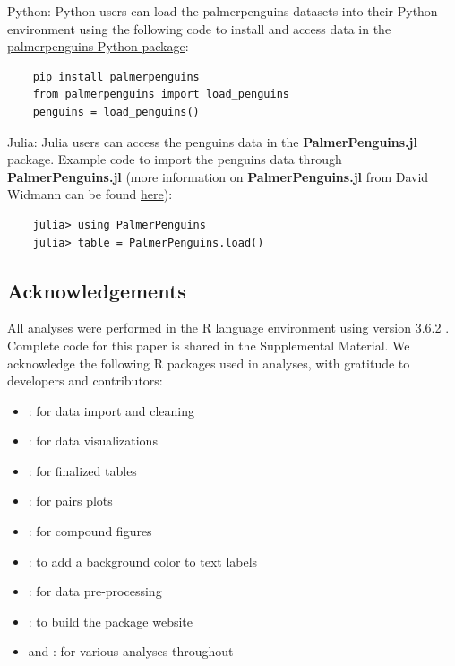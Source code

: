 Python: Python users can load the palmerpenguins datasets into their
Python environment using the following code to install and access data
in the \href{https://pypi.org/project/palmerpenguins/}{palmerpenguins
Python package}:

\begin{verbatim}
    pip install palmerpenguins
    from palmerpenguins import load_penguins
    penguins = load_penguins()
\end{verbatim}

Julia: Julia users can access the penguins data in the
\textbf{PalmerPenguins.jl} package. Example code to import the penguins
data through \textbf{PalmerPenguins.jl} (more information on
\textbf{PalmerPenguins.jl} from David Widmann can be found
\href{https://github.com/devmotion/PalmerPenguins.jl}{here}):

\begin{verbatim}
    julia> using PalmerPenguins
    julia> table = PalmerPenguins.load()
\end{verbatim}

\hypertarget{acknowledgements}{%
\subsection{Acknowledgements}\label{acknowledgements}}

All analyses were performed in the R language environment using version
3.6.2 \citep{r_core_team_r_2019}. Complete code for this paper is shared
in the Supplemental Material. We acknowledge the following R packages
used in analyses, with gratitude to developers and contributors:

\begin{itemize}
\tightlist
\item
   \citep{wickham_welcome_2019}: for data import and
  cleaning
\item
   \citep{wickham_ggplot2_2016}: for data
  visualizations
\item
   \citep{zhu_kableextra_2019}: for finalized tables
\item
   \citep{schloerke_ggally_2020}: for pairs plots
\item
   \citep{pedersen_patchwork_2019}: for compound
  figures
\item
   \citep{yu_shadowtext_2019}: to add a background
  color to text labels
\item
   \citep{kuhn_recipes_2020}: for data pre-processing
\item
   \citep{wickham_pkgdown_2020}: to build the package
  website
\item
   and  \citep{r_core_team_r_2019}: for various
  analyses throughout
\end{itemize}

